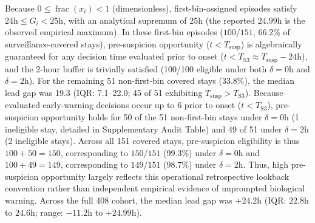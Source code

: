 \documentclass[10pt,twocolumn,a4paper]{article}
\begin{document}
Because $0 \le \operatorname{frac}(x_i) < 1$ (dimensionless), first-bin-assigned episodes satisfy $24\text{h} \le G_i < 25\text{h}$, with an analytical supremum of $25\text{h}$ (the reported $24.99\text{h}$ is the observed empirical maximum). In these first-bin episodes ($100/151$, 66.2\% of surveillance-covered stays), pre-suspicion opportunity ($t < T_{\mathrm{susp}}$) is algebraically guaranteed for any decision time evaluated prior to onset ($t < T_{\text{S3}} \approx T_{\mathrm{susp}} - 24\text{h}$), and the 2-hour buffer is trivially satisfied (100/100 eligible under both $\delta=0\mathrm{h}$ and $\delta=2\mathrm{h}$). For the remaining 51 non-first-bin covered stays (33.8\%), the median lead gap was 19.3 (IQR: 7.1--22.0; 45 of 51 exhibiting $T_{\mathrm{susp}} > T_{\mathrm{S3}}$). Because evaluated early-warning decisions occur up to 6 prior to onset ($t < T_{\mathrm{S3}}$), pre-suspicion opportunity holds for 50 of the 51 non-first-bin stays under $\delta=0\mathrm{h}$ (1 ineligible stay, detailed in Supplementary Audit Table) and 49 of 51 under $\delta=2\mathrm{h}$ (2 ineligible stays). Across all 151 covered stays, pre-suspicion eligibility is thus $100 + 50 = 150$, corresponding to $150/151$ (99.3\%) under $\delta=0\mathrm{h}$ and $100 + 49 = 149$, corresponding to $149/151$ (98.7\%) under $\delta=2\mathrm{h}$. Thus, high pre-suspicion opportunity largely reflects this operational retrospective lookback convention rather than independent empirical evidence of unprompted biological warning. Across the full 408 cohort, the median lead gap was $+24.2\text{h}$ (IQR: $22.8\text{h}$ to $24.6\text{h}$; range: $-11.2\text{h}$ to $+24.99\text{h}$).
\end{document}
